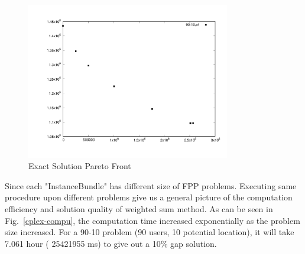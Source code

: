 \documentclass[10pt,journal,compsoc]{IEEEtran}
\newcommand{\Fig}[1]{Fig.~\ref{#1}}
\begin{document}
\begin{figure}[H]
\centerline{\includegraphics[width=3.5in]{9010pf.pdf}}
\caption{Exact Solution Pareto Front} 
\label{espf}
\end{figure}
Since each "InstanceBundle" has different size of FPP problems. Executing same procedure upon different problems give us a general picture of the computation efficiency and solution quality of weighted sum method.
As can be seen in \Fig{cplex-compu}, the computation time increased exponentially as the problem size increased. 
For a 90-10 problem (90 users, 10 potential location), it will take 7.061 hour ( 25421955 ms) to give out a 10\% gap  solution. 
\end{document}
